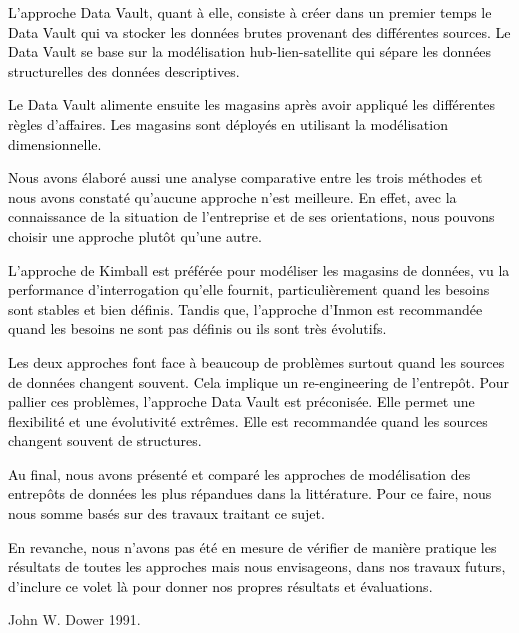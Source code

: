 \documentclass[a4paper,12pt]{report}
\begin{document}
\textcolor{black}{L’approche Data Vault, quant à elle, consiste à créer dans un premier temps le Data Vault qui va stocker les données brutes provenant des différentes sources. Le Data Vault se base sur la modélisation hub-lien-satellite qui sépare les données structurelles des données descriptives. }



\textcolor{black}{Le Data Vault alimente ensuite les magasins après avoir appliqué les différentes règles d’affaires. Les magasins sont déployés en utilisant la modélisation dimensionnelle. }



\textcolor{black}{ Nous avons élaboré aussi une analyse comparative entre les trois méthodes et nous avons constaté qu’aucune approche n’est meilleure. En effet, avec la connaissance de la situation de l’entreprise et de ses orientations, nous pouvons choisir une approche plutôt qu’une autre.}


\textcolor{black}{L’approche de Kimball est préférée pour modéliser les magasins de données, vu la performance d’interrogation qu’elle fournit, particulièrement quand les besoins sont stables et bien définis. Tandis que, l’approche d’Inmon est recommandée quand les besoins ne sont pas définis ou ils sont très évolutifs. }


\textcolor{black}{Les deux approches font face à beaucoup de problèmes surtout quand les sources de données changent souvent. Cela implique un re-engineering de l’entrepôt.
Pour pallier ces problèmes, l’approche Data Vault est préconisée. Elle permet une flexibilité et une évolutivité extrêmes. Elle est recommandée quand les sources changent souvent de structures. }

\textcolor{black}{
Au final, nous avons présenté et comparé les approches de modélisation des entrepôts de données les plus répandues dans la littérature. Pour ce faire, nous nous somme basés sur des travaux traitant ce sujet.}

\textcolor{black}{En revanche, nous n’avons pas été en mesure de vérifier de manière pratique les résultats de toutes les approches mais nous envisageons, dans nos travaux futurs, d’inclure ce volet là pour donner nos propres résultats et évaluations.
}



\begin{thebibliography}{99}


 John W. Dower 1991.
  
\end{thebibliography}
\end{document}
